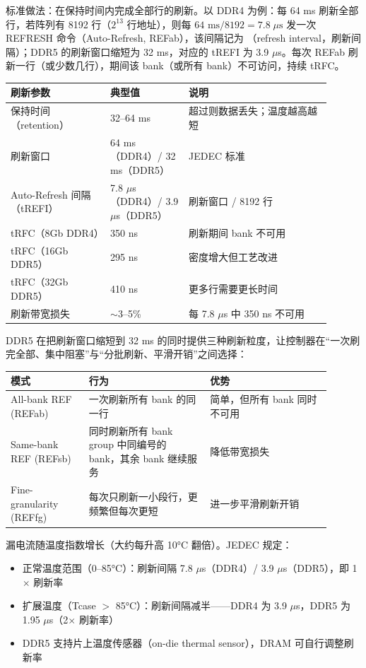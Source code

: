 标准做法：在保持时间内完成全部行的刷新。以 DDR4 为例：每 64 ms 刷新全部行，若阵列有 8192 行（$2^{13}$ 行地址），则每 $64\text{ ms} / 8192 = 7.8\;\mu\text{s}$ 发一次 REFRESH 命令（Auto-Refresh, REFab），该间隔记为 （refresh interval，刷新间隔）；DDR5 的刷新窗口缩短为 32 ms，对应的 tREFI 为 3.9 $\mu$s。每次 REFab 刷新一行（或少数几行），期间该 bank（或所有 bank）不可访问，持续 tRFC。

\begin{longtable}{L{0.28\linewidth}L{0.22\linewidth}L{0.4\linewidth}}
\toprule
刷新参数 & 典型值 & 说明 \\
\midrule
保持时间（retention） & 32--64 ms & 超过则数据丢失；温度越高越短 \\\tablerowrule
刷新窗口 & 64 ms（DDR4）/ 32 ms（DDR5） & JEDEC 标准 \\\tablerowrule
Auto-Refresh 间隔（tREFI） & 7.8 $\mu$s（DDR4）/ 3.9 $\mu$s（DDR5） & 刷新窗口 / 8192 行 \\\tablerowrule
tRFC（8Gb DDR4） & 350 ns & 刷新期间 bank 不可用 \\\tablerowrule
tRFC（16Gb DDR5） & 295 ns & 密度增大但工艺改进 \\\tablerowrule
tRFC（32Gb DDR5） & 410 ns & 更多行需要更长时间 \\\tablerowrule
刷新带宽损失 & $\sim$3--5\% & 每 7.8 $\mu$s 中 350 ns 不可用 \\
\bottomrule
\end{longtable}


DDR5 在把刷新窗口缩短到 32 ms 的同时提供三种刷新粒度，让控制器在“一次刷完全部、集中阻塞”与“分批刷新、平滑开销”之间选择：

\begin{longtable}{L{0.22\linewidth}L{0.34\linewidth}L{0.34\linewidth}}
\toprule
模式 & 行为 & 优势 \\
\midrule
All-bank REF (REFab) & 一次刷新所有 bank 的同一行 & 简单，但所有 bank 同时不可用 \\\tablerowrule
Same-bank REF (REFsb) & 同时刷新所有 bank group 中同编号的 bank，其余 bank 继续服务 & 降低带宽损失 \\\tablerowrule
Fine-\allowbreak granularity (REFfg) & 每次只刷新一小段行，更频繁但每次更短 & 进一步平滑刷新开销 \\
\bottomrule
\end{longtable}


漏电流随温度指数增长（大约每升高 10°C 翻倍）。JEDEC 规定：
\begin{itemize}
  \item 正常温度范围（0--85°C）：刷新间隔 7.8 $\mu$s（DDR4）/ 3.9 $\mu$s（DDR5），即 1$\times$ 刷新率
  \item 扩展温度（Tcase $>$ 85°C）：刷新间隔减半——DDR4 为 3.9 $\mu$s，DDR5 为 1.95 $\mu$s（2$\times$ 刷新率）
  \item DDR5 支持片上温度传感器（on-die thermal sensor），DRAM 可自行调整刷新率
\end{itemize}

